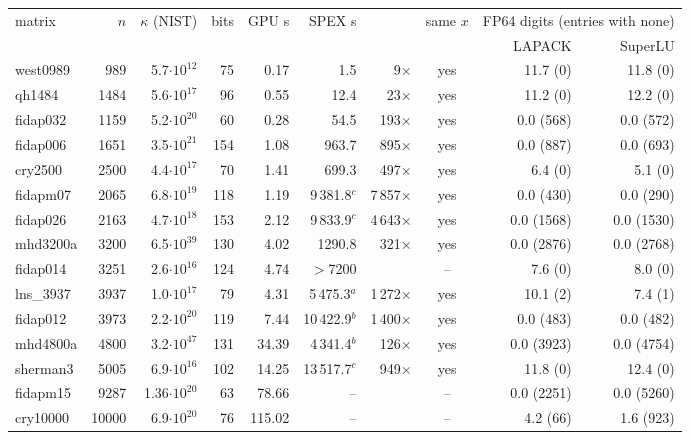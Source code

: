 \documentclass[11pt]{article}
\begin{document}
\begin{table}[h]\centering\footnotesize\setlength{\tabcolsep}{3pt}
\begin{tabular}{lrrrrrrcrr}
\hline
matrix & $n$ & $\kappa$ (NIST) & bits & GPU s & SPEX s & & same $x$ & \multicolumn{2}{c}{FP64 digits (entries with none)}\\
 & & & & & & & & LAPACK & SuperLU \\ \hline
west0989 & 989 & 5.7$\cdot 10^{12}$ & 75 & 0.17 & 1.5 & 9$\times$ & yes & 11.7 (0) & 11.8 (0) \\
qh1484 & 1484 & 5.6$\cdot 10^{17}$ & 96 & 0.55 & 12.4 & 23$\times$ & yes & 11.2 (0) & 12.2 (0) \\
fidap032 & 1159 & 5.2$\cdot 10^{20}$ & 60 & 0.28 & 54.5 & 193$\times$ & yes & 0.0 (568) & 0.0 (572) \\
fidap006 & 1651 & 3.5$\cdot 10^{21}$ & 154 & 1.08 & 963.7 & 895$\times$ & yes & 0.0 (887) & 0.0 (693) \\
cry2500 & 2500 & 4.4$\cdot 10^{17}$ & 70 & 1.41 & 699.3 & 497$\times$ & yes & 6.4 (0) & 5.1 (0) \\
fidapm07 & 2065 & 6.8$\cdot 10^{19}$ & 118 & 1.19 & 9\,381.8$^{c}$ & 7\,857$\times$ & yes & 0.0 (430) & 0.0 (290) \\
fidap026 & 2163 & 4.7$\cdot 10^{18}$ & 153 & 2.12 & 9\,833.9$^{c}$ & 4\,643$\times$ & yes & 0.0 (1568) & 0.0 (1530) \\
mhd3200a & 3200 & 6.5$\cdot 10^{39}$ & 130 & 4.02 & 1290.8 & 321$\times$ & yes & 0.0 (2876) & 0.0 (2768) \\
fidap014 & 3251 & 2.6$\cdot 10^{16}$ & 124 & 4.74 & $>$7200 &  & -- & 7.6 (0) & 8.0 (0) \\
lns\_3937 & 3937 & 1.0$\cdot 10^{17}$ & 79 & 4.31 & 5\,475.3$^{a}$ & 1\,272$\times$ & yes & 10.1 (2) & 7.4 (1) \\
fidap012 & 3973 & 2.2$\cdot 10^{20}$ & 119 & 7.44 & 10\,422.9$^{b}$ & 1\,400$\times$ & yes & 0.0 (483) & 0.0 (482) \\
mhd4800a & 4800 & 3.2$\cdot 10^{47}$ & 131 & 34.39 & 4\,341.4$^{b}$ & 126$\times$ & yes & 0.0 (3923) & 0.0 (4754) \\
sherman3 & 5005 & 6.9$\cdot 10^{16}$ & 102 & 14.25 & 13\,517.7$^{c}$ & 949$\times$ & yes & 11.8 (0) & 12.4 (0) \\
fidapm15 & 9287 & 1.36$\cdot 10^{20}$ & 63 & 78.66 & -- &  & -- & 0.0 (2251) & 0.0 (5260) \\
cry10000 & 10000 & 6.9$\cdot 10^{20}$ & 76 & 115.02 & -- &  & -- & 4.2 (66) & 1.6 (923) \\

\end{tabular}
\end{table}
\end{document}
